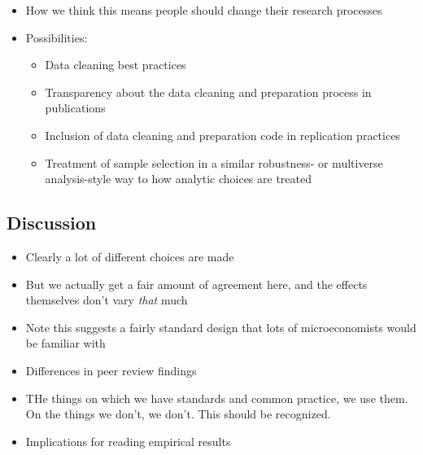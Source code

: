 \documentclass[
  letterpaper,
  DIV=11,
  numbers=noendperiod]{scrartcl}
\begin{document}
\begin{itemize}
\item
  How we think this means people should change their research processes
\item
  Possibilities:

  \begin{itemize}
  \item
    Data cleaning best practices
  \item
    Transparency about the data cleaning and preparation process in
    publications
  \item
    Inclusion of data cleaning and preparation code in replication
    practices
  \item
    Treatment of sample selection in a similar robustness- or multiverse
    analysis-style way to how analytic choices are treated
  \end{itemize}
\end{itemize}

\hypertarget{discussion}{%
\subsection{Discussion}\label{discussion}}

\begin{itemize}
\item
  Clearly a lot of different choices are made
\item
  But we actually get a fair amount of agreement here, and the effects
  themselves don't vary \emph{that} much
\item
  Note this suggests a fairly standard design that lots of
  microeconomists would be familiar with
\item
  Differences in peer review findings
\item
  THe things on which we have standards and common practice, we use
  them. On the things we don't, we don't. This should be recognized.
\item
  Implications for reading empirical results
\end{itemize}
\end{document}

